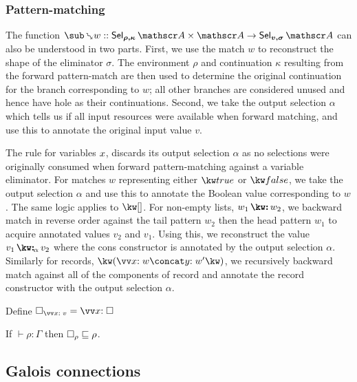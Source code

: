 \subsubsection{Pattern-matching}

The function $\matchBwdF{w} :: \Prod{\Sel{\rho, \kappa}{A}}{\Ann{A}} \to \Sel{v, \sigma}{A}$ can also be understood in two parts. First, we use the match $w$ to reconstruct the shape of the eliminator $\sigma$. The environment $\rho$ and continuation $\kappa$ resulting from the forward pattern-match are then used to determine the original continuation for the branch corresponding to $w$; all other branches are considered unused and hence have hole as their continuations. Second, we take the output selection $\alpha$ which tells us if all input resources were available when forward matching, and use this to annotate the original input value $v$.

The rule for variables $x$, discards its output selection $\alpha$ as no selections were originally consumed when forward pattern-matching against a variable eliminator. For matches $w$ representing either $\matchTrue$ or $\matchFalse$, we take the output selection $\alpha$ and use this to annotate the Boolean value corresponding to $w$. The same logic applies to $\matchNil$. For non-empty lists, $\matchCons{w_1}{w_2}$, we backward match in reverse order against the tail pattern $w_2$ then the head pattern $w_1$ to acquire annotated values $v_2$ and $v_1$. Using this, we reconstruct the value $\annCons{v_1}{v_2}{\alpha}$ where the cons constructor is annotated by the output selection $\alpha$. Similarly for records, $\matchRec{\vec{\bind{x}{w}} \concat \bind{y}{w'}}$, we recursively backward match against all of the components of record and annotate the record constructor with the output selection $\alpha$.



\begin{definition}
Define $\hole_{\vec{\bind{x}{v}}} = \vec{\bind{x}{\hole}}$
\end{definition}

\begin{lemma}
\label{lem:core-language:hole-env}If $\vdash \rho: \Gamma$ then $\square_{\rho} \sqsubseteq \rho$.
\end{lemma}

\subsection{Galois connections}
\label{sec:data-dependencies:analysis:galois-connections}

